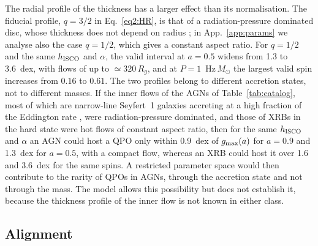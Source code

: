 The radial profile of the thickness has a larger effect than its normalisation.
The fiducial profile, $q=3/2$ in Eq.~\eqref{eq2:HR}, is that of a radiation-pressure dominated disc, whose thickness does not depend on radius \citep{accretion}; in App.~\ref{app:params} we analyse also the case $q=1/2$, which gives a constant aspect ratio.
For $q=1/2$ and the same $h_\textup{ISCO}$ and $\alpha$, the valid interval at $a=0.5$ widens from 1.3 to 3.6~dex, with flows of up to $\simeq320\,R_g$, and at $P=1$~Hz\,$M_\odot$ the largest valid spin increases from $0.16$ to $0.61$.
The two profiles belong to different accretion states, not to different masses.
If the inner flows of the AGNs of Table~\ref{tab:catalog}, most of which are narrow-line Seyfert~1 galaxies accreting at a high fraction of the Eddington rate \citep[e.g.]{DoneJin2016, Jin2020}, were radiation-pressure dominated, and those of XRBs in the hard state were hot flows of constant aspect ratio, then for the same $h_\textup{ISCO}$ and $\alpha$ an AGN could host a QPO only within 0.9~dex of $g_\textup{max}(a)$ for $a=0.9$ and 1.3~dex for $a=0.5$, with a compact flow, whereas an XRB could host it over 1.6 and 3.6~dex for the same spins.
A restricted parameter space would then contribute to the rarity of QPOs in AGNs, through the accretion state and not through the mass.
The model allows this possibility but does not establish it, because the thickness profile of the inner flow is not known in either class.


\subsection{Alignment}
\label{sec5:align}

